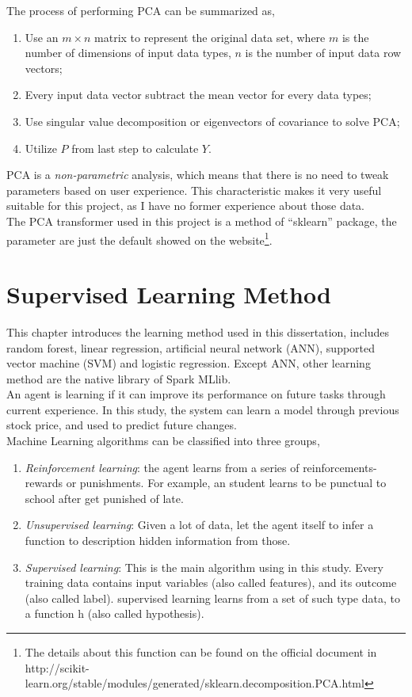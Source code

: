 The process of performing PCA can be summarized as\cite{shlens2014tutorial},
\begin{enumerate}
	\item Use an $ m \times n $ matrix to represent the original data set, where $ m $ is the number of dimensions of input data types, $ n $ is the number of input data row vectors;
	\item Every input data vector subtract the mean vector for every data types;
	\item Use singular value decomposition or eigenvectors of covariance to solve PCA;
	\item Utilize $ P $ from last step to calculate $ Y $.
\end{enumerate}

PCA is a \emph{non-parametric} analysis, which means that there is no need to tweak parameters based on user experience\cite{shlens2014tutorial}. This characteristic makes it very useful suitable for this project, as I have no former experience about those data.\\

The PCA transformer used in this project is a method of ``sklearn'' package, the parameter are just the default showed on the website\footnote{The details about this function can be found on the official document in http://scikit-learn.org/stable/modules/generated/sklearn.decomposition.PCA.html}.

\section{Supervised Learning Method}

This chapter introduces the learning method used in this dissertation, includes random forest, linear regression, artificial neural network (ANN), supported vector machine (SVM) and logistic regression. Except ANN, other learning method are the native library of Spark MLlib.\\


An agent is learning if it can improve its performance on future tasks through current experience. In this study, the system can learn a model through previous stock price, and used to predict future changes.\\


Machine Learning algorithms can be classified into three groups\cite[p.~650]{russell2003artificial}, 
\begin{enumerate}
	\item \textit{Reinforcement learning}: the agent learns from a series of reinforcements-rewards or punishments. For example, an student learns to be punctual to school after get punished of late.
	\item \textit{Unsupervised learning}: Given a lot of data, let the agent itself to infer a function to description hidden information from those.
	\item \textit{Supervised learning}: This is the main algorithm using in this study. Every training data contains input variables (also called features), and its outcome (also called label). supervised learning learns from a set of such type data, to a function h (also called hypothesis).
\end{enumerate}



